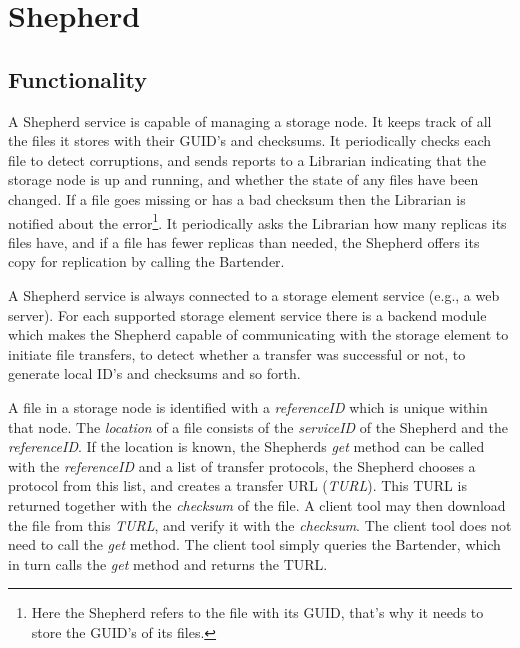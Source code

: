 \documentclass{book}
\begin{document}

\newpage

\section{Shepherd} %
\label{sec:shepherds}

\subsection{Functionality} %

A Shepherd service is capable of managing a storage node. It keeps track of all the files it stores with their GUID's and checksums. It periodically checks each file to detect corruptions, and sends reports to a Librarian indicating that the storage node is up and running, and whether the state of any files have been changed. If a file goes missing or has a bad checksum then the Librarian is notified about the error\footnote{Here the Shepherd refers to the file with its GUID, that's why it needs to store the GUID's of its files.}. It periodically asks the Librarian how many replicas its files have, and if a file has fewer replicas than needed, the Shepherd offers its copy for replication by calling the Bartender.

A Shepherd service is always connected to a storage element service (e.g., a web server). For each supported storage element service there is a backend module which makes the Shepherd capable of communicating with the storage element to initiate file transfers, to detect whether a transfer was successful or not, to generate local ID's and checksums and so forth.

A file in a storage node is identified with a \emph{referenceID} which is unique within that node. The \emph{location} of a file consists of the \emph{serviceID} of the Shepherd and the \emph{referenceID}. If the location is known, the Shepherds \emph{get} method can be called with the \emph{referenceID} and a list of transfer protocols, the Shepherd chooses a protocol from this list, and creates a transfer URL (\emph{TURL}). This TURL is returned together with the \emph{checksum} of the file. A client tool may then download the file from this \emph{TURL}, and verify it with the \emph{checksum}. The client tool does not need to call the \emph{get} method. The client tool simply queries the Bartender, which in turn calls the \emph{get} method and returns the TURL.
\end{document}
